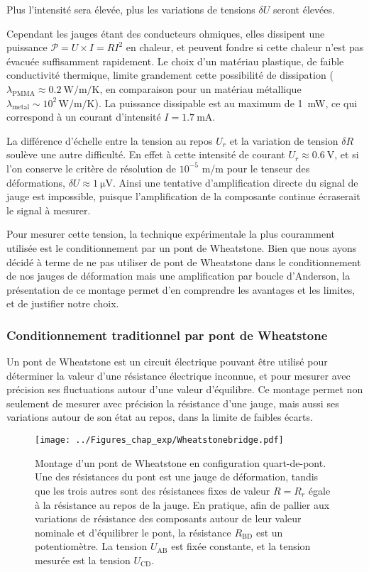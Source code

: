 Plus l'intensité sera élevée, plus les variations de tensions $\delta U$ seront élevées. 


Cependant les jauges étant des conducteurs ohmiques, elles dissipent une puissance $\mathcal{P}=U\times I=R I^2$ en chaleur, et peuvent fondre si cette chaleur n'est pas évacuée suffisamment rapidement. Le choix d'un matériau plastique, de faible conductivité thermique, limite grandement cette possibilité de dissipation ($\lambda_{\mathrm{PMMA}}\approx \SI{0.2}{\watt\per\meter\per\kelvin}$, en comparaison pour un matériau métallique $\lambda_{\mathrm{metal}}\sim 10^2\,\unit{\watt\per\meter\per\kelvin}$). La puissance dissipable est au maximum de \SI{1}{\milli\watt}, ce qui correspond à un courant d'intensité $I=\SI{1.7}{\milli\ampere}$.

La différence d'échelle entre la tension au repos $U_r$ et la variation de tension $\delta R$ soulève une autre difficulté. En effet à cette intensité de courant $U_r\approx\SI{0.6}{\volt}$, et si l'on conserve le critère de résolution de $10^{-5}$ m/m pour le tenseur des déformations, $\delta U\approx\SI{1}{\micro\volt}$. Ainsi une tentative d'amplification directe du signal de jauge est impossible, puisque l'amplification de la composante continue écraserait le signal à mesurer.

Pour mesurer cette tension, la technique expérimentale la plus couramment utilisée est le conditionnement par un pont de Wheatstone. Bien que nous ayons décidé à terme de ne pas utiliser de pont de Wheatstone dans le conditionnement de nos jauges de déformation mais une amplification par boucle d'Anderson, la présentation de ce montage permet d'en comprendre les avantages et les limites, et de justifier notre choix.

\subsubsection{Conditionnement traditionnel par pont de Wheatstone}


Un pont de Wheatstone est un circuit électrique pouvant être utilisé pour déterminer la valeur d'une résistance électrique inconnue, et pour mesurer avec précision ses fluctuations autour d'une valeur d'équilibre. Ce montage permet non seulement de mesurer avec précision la résistance d'une jauge, mais aussi ses variations autour de son état au repos, dans la limite de faibles écarts.



\begin{figure}[htb]
\centering	
\texttt{[image: ../Figures\_chap\_exp/Wheatstonebridge.pdf]}
\caption[Pont de Wheatstone]{Montage d'un pont de Wheatstone en configuration quart-de-pont. Une des résistances du pont est une jauge de déformation, tandis que les trois autres sont des résistances fixes de valeur $R=R_r$ égale à la résistance au repos de la jauge. En pratique, afin de pallier aux variations de résistance des composants autour de leur valeur nominale et d'équilibrer le pont, la résistance $R_{\mathrm{BD}}$ est un potentiomètre. La tension $U_{\mathrm{AB}}$ est fixée constante, et la tension mesurée est la tension $U_{\mathrm{CD}}$.}
\label{fig:wheatstone}
\end{figure}


